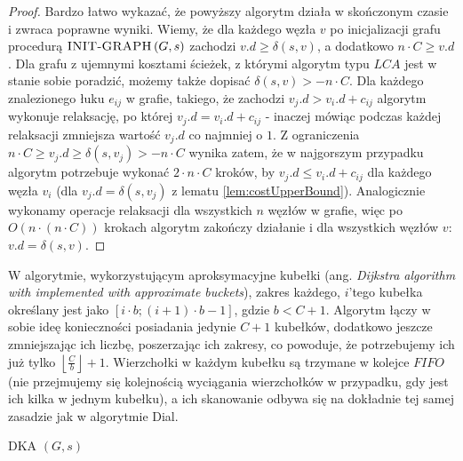 \begin{proof}

Bardzo łatwo wykazać, że powyższy algorytm działa w skończonym czasie i zwraca poprawne wyniki. Wiemy, że dla każdego węzła $v$ po inicjalizacji grafu procedurą $ \textrm{\textsc{INIT-GRAPH}} \left( G, s \right)$ zachodzi $v.d \geqslant \delta \left( s, v \right)$, a dodatkowo $n \cdot C \geqslant v.d$. Dla grafu z ujemnymi kosztami ścieżek, z którymi algorytm typu $LCA$ jest w stanie sobie poradzić, możemy także dopisać $ \delta \left( s, v \right) > - n \cdot C$. Dla każdego znalezionego łuku $e_{ij}$ w grafie, takiego, że zachodzi $v_{j}.d > v_{i}.d + c_{ij}$ algorytm wykonuje relaksację, po której $v_{j}.d = v_{i}.d + c_{ij}$ - inaczej mówiąc podczas każdej relaksacji zmniejsza wartość $v_{j}.d$ co najmniej o $1$. Z ograniczenia $ n \cdot C \geqslant v_{j}.d \geqslant \delta \left( s, v_{j} \right) > - n \cdot C$ wynika zatem, że w najgorszym przypadku algorytm potrzebuje wykonać $2 \cdot n \cdot C$ kroków, by $v_{j}.d \leqslant v_{i}.d + c_{ij}$ dla każdego węzła $v_{i}$ (dla $v_{j}.d = \delta \left( s, v_{j} \right)$ z lematu \ref{lem:costUpperBound}). Analogicznie wykonamy operacje relaksacji dla wszystkich $n$ węzłów w grafie, więc po $O \left( n \cdot \left( n \cdot C \right) \right) $ krokach algorytm zakończy działanie i dla wszystkich węzłów $v$: $v.d = \delta \left( s, v \right)$.

\end{proof}

W algorytmie, wykorzystującym aproksymacyjne kubełki (ang. \textit{Dijkstra algorithm with implemented with approximate buckets}), zakres każdego, $i$'tego kubełka określany jest jako $ \left[ i \cdot b ; \left( i + 1 \right) \cdot b - 1 \right]$, gdzie $b < C + 1$. Algorytm łączy w sobie ideę konieczności posiadania jedynie $C+1$ kubełków, dodatkowo jeszcze zmniejszając ich liczbę, poszerzając ich zakresy, co powoduje, że potrzebujemy ich już tylko $\left \lfloor \frac{C}{b} \right \rfloor + 1$. Wierzchołki w każdym kubełku są trzymane w kolejce $FIFO$ (nie przejmujemy się kolejnością wyciągania wierzchołków w przypadku, gdy jest ich kilka w jednym kubełku), a ich skanowanie odbywa się na dokładnie tej samej zasadzie jak w algorytmie Dial.

\begin{algorithm}[!htbp]
\DontPrintSemicolon
{}
\caption{ DKA $\left( G, s \right)$\label{alg:AproximateBuckets}}
\end{algorithm}

